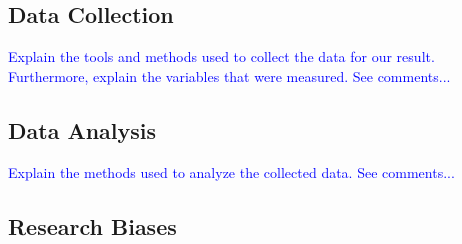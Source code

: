 \subsection{Data Collection}
%
\textcolor{blue}{Explain the tools and methods used to collect the data for our
result. Furthermore, explain the variables that were measured. See comments...}

\subsection{Data Analysis}
%
%
\textcolor{blue}{Explain the methods used to analyze the collected data. See comments...}

\subsection{Research Biases}
%
